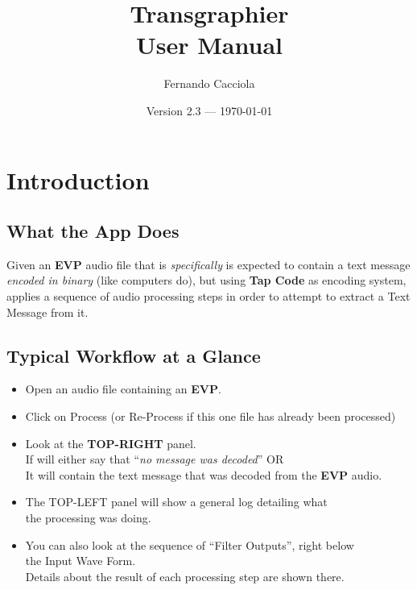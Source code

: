 \documentclass[11pt]{report}
\title{Transgraphier\\{\large User Manual}}
\author{Fernando Cacciola}
\date{Version 2.3 --- \today}
\begin{document}
    \maketitle
    \tableofcontents
    
    \chapter{Introduction}
    \section{What the App Does}
       
       Given an \textbf{EVP} audio file that is \textit{specifically} is expected
       to contain a text message \textit{encoded in binary} (like computers do),
       but using \textbf{Tap Code} as encoding system, applies a sequence of audio processing steps in order to attempt to extract a Text Message from it.
       
    \section{Typical Workflow at a Glance}
    
\begin{itemize}
    \item Open an audio file containing an \textbf{EVP}.
         
    \item Click on Process (or Re-Process if this one file has already been processed)
         
    \item Look at the \textbf{TOP-RIGHT} panel.\\
          If will either say that ``\textit{no message was decoded}'' OR\\
          It will contain the text message that was decoded from the \textbf{EVP} audio.
         
    \item The TOP-LEFT panel will show a general log detailing what\\
          the processing was doing.
         
    \item You can also look at the sequence of ``Filter Outputs'', right below\\
           the Input Wave Form.\\
           Details about the result of each processing step are shown there.
\end{itemize}
    
\end{document}
